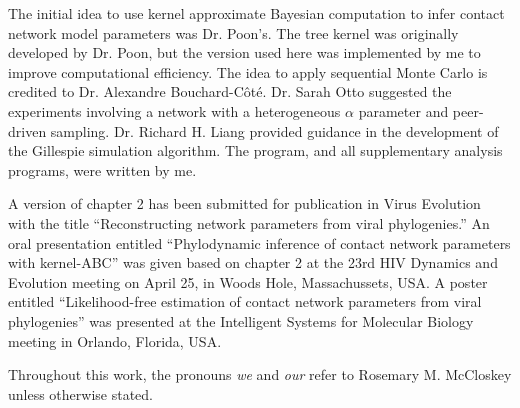 The initial idea to use kernel approximate Bayesian computation to infer
contact network model parameters was Dr. Poon's. The tree kernel was originally
developed by Dr. Poon, but the version used here was implemented by me to
improve computational efficiency. The idea to apply sequential Monte Carlo is
credited to Dr. Alexandre Bouchard-C\^ot\'e. Dr. Sarah Otto suggested the
experiments involving a network with a heterogeneous $\alpha$ parameter and
peer-driven sampling. Dr. Richard H. Liang provided guidance in the development
of the Gillespie simulation algorithm. The  program, and all
supplementary analysis programs, were written by me.

A version of chapter 2 has been submitted for publication in Virus Evolution
with the title ``Reconstructing network parameters from viral phylogenies.'' An
oral presentation entitled ``Phylodynamic inference of contact network
parameters with kernel-ABC'' was given based on chapter 2 at the 23rd HIV
Dynamics and Evolution meeting on April 25, in Woods Hole, Massachussets, USA.
A poster entitled ``Likelihood-free estimation of contact network parameters
from viral phylogenies'' was presented at the Intelligent Systems for Molecular
Biology meeting in Orlando, Florida, USA.

Throughout this work, the pronouns \textit{we} and \textit{our} refer to
Rosemary M. McCloskey unless otherwise stated.
